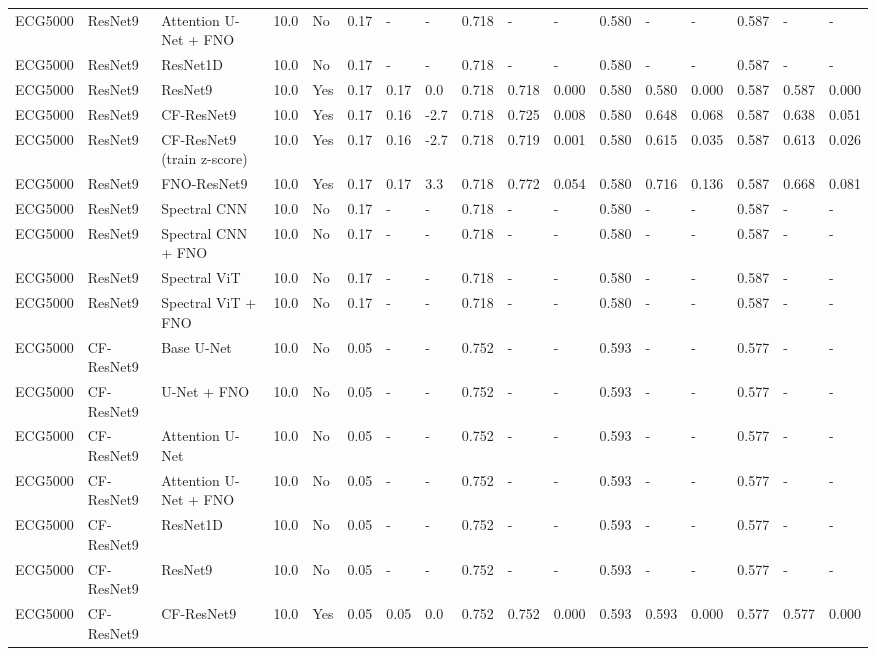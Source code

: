 \begin{longtable}{lllllllllllllllll}
ECG5000 & ResNet9 & Attention U-Net + FNO & 10.0 & No & 0.17 & - & - & 0.718 & - & - & 0.580 & - & - & 0.587 & - & - \\
ECG5000 & ResNet9 & ResNet1D & 10.0 & No & 0.17 & - & - & 0.718 & - & - & 0.580 & - & - & 0.587 & - & - \\
ECG5000 & ResNet9 & ResNet9 & 10.0 & Yes & 0.17 & 0.17 & 0.0 & 0.718 & 0.718 & 0.000 & 0.580 & 0.580 & 0.000 & 0.587 & 0.587 & 0.000 \\
ECG5000 & ResNet9 & CF-ResNet9 & 10.0 & Yes & 0.17 & 0.16 & -2.7 & 0.718 & 0.725 & 0.008 & 0.580 & 0.648 & 0.068 & 0.587 & 0.638 & 0.051 \\
ECG5000 & ResNet9 & CF-ResNet9 (train z-score) & 10.0 & Yes & 0.17 & 0.16 & -2.7 & 0.718 & 0.719 & 0.001 & 0.580 & 0.615 & 0.035 & 0.587 & 0.613 & 0.026 \\
ECG5000 & ResNet9 & FNO-ResNet9 & 10.0 & Yes & 0.17 & 0.17 & 3.3 & 0.718 & 0.772 & 0.054 & 0.580 & 0.716 & 0.136 & 0.587 & 0.668 & 0.081 \\
ECG5000 & ResNet9 & Spectral CNN & 10.0 & No & 0.17 & - & - & 0.718 & - & - & 0.580 & - & - & 0.587 & - & - \\
ECG5000 & ResNet9 & Spectral CNN + FNO & 10.0 & No & 0.17 & - & - & 0.718 & - & - & 0.580 & - & - & 0.587 & - & - \\
ECG5000 & ResNet9 & Spectral ViT & 10.0 & No & 0.17 & - & - & 0.718 & - & - & 0.580 & - & - & 0.587 & - & - \\
ECG5000 & ResNet9 & Spectral ViT + FNO & 10.0 & No & 0.17 & - & - & 0.718 & - & - & 0.580 & - & - & 0.587 & - & - \\
ECG5000 & CF-ResNet9 & Base U-Net & 10.0 & No & 0.05 & - & - & 0.752 & - & - & 0.593 & - & - & 0.577 & - & - \\
ECG5000 & CF-ResNet9 & U-Net + FNO & 10.0 & No & 0.05 & - & - & 0.752 & - & - & 0.593 & - & - & 0.577 & - & - \\
ECG5000 & CF-ResNet9 & Attention U-Net & 10.0 & No & 0.05 & - & - & 0.752 & - & - & 0.593 & - & - & 0.577 & - & - \\
ECG5000 & CF-ResNet9 & Attention U-Net + FNO & 10.0 & No & 0.05 & - & - & 0.752 & - & - & 0.593 & - & - & 0.577 & - & - \\
ECG5000 & CF-ResNet9 & ResNet1D & 10.0 & No & 0.05 & - & - & 0.752 & - & - & 0.593 & - & - & 0.577 & - & - \\
ECG5000 & CF-ResNet9 & ResNet9 & 10.0 & No & 0.05 & - & - & 0.752 & - & - & 0.593 & - & - & 0.577 & - & - \\
ECG5000 & CF-ResNet9 & CF-ResNet9 & 10.0 & Yes & 0.05 & 0.05 & 0.0 & 0.752 & 0.752 & 0.000 & 0.593 & 0.593 & 0.000 & 0.577 & 0.577 & 0.000 \\

\end{longtable}
